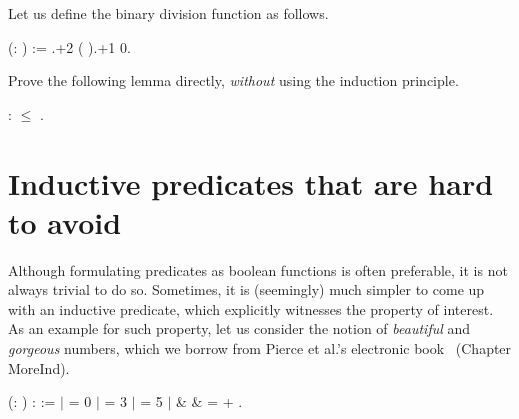 \begin{exercise}


Let us define the binary division function  as follows.


\begin{coqdoccode}
\coqdocemptyline
\coqdocnoindent
{}  (: ) :=    .+2  ( ).+1  0.\coqdoceol
\coqdocemptyline
\end{coqdoccode}


Prove the following lemma directly, \textit{without} using the 
induction principle.


\begin{coqdoccode}
\coqdocemptyline
\coqdocemptyline
\coqdocnoindent
{}  :   \ensuremath{\le} .\coqdoceol
\coqdocemptyline
\end{coqdoccode}


\end{exercise}


\section{Inductive predicates that are hard to avoid}


\label{sec:cannot}


Although formulating predicates as boolean functions is often
preferable, it is not always trivial to do so. Sometimes, it is
(seemingly) much simpler to come up with an inductive predicate, which
explicitly witnesses the property of interest. As an example for such
property, let us consider the notion of \textit{beautiful} and \textit{gorgeous}
numbers, which we borrow from Pierce et al.'s electronic
book~\cite{Pierce-al:SF} (Chapter \textsf{MoreInd}).




\begin{coqdoccode}
\coqdocemptyline
\coqdocnoindent
{}  (: ) :  :=\coqdoceol
\coqdocnoindent
\ensuremath{|}    = 0\coqdoceol
\coqdocnoindent
\ensuremath{|}    = 3\coqdoceol
\coqdocnoindent
\ensuremath{|}    = 5\coqdoceol
\coqdocnoindent
\ensuremath{|}       \&   \&  =  + .\coqdoceol
\coqdocemptyline
\end{coqdoccode}


